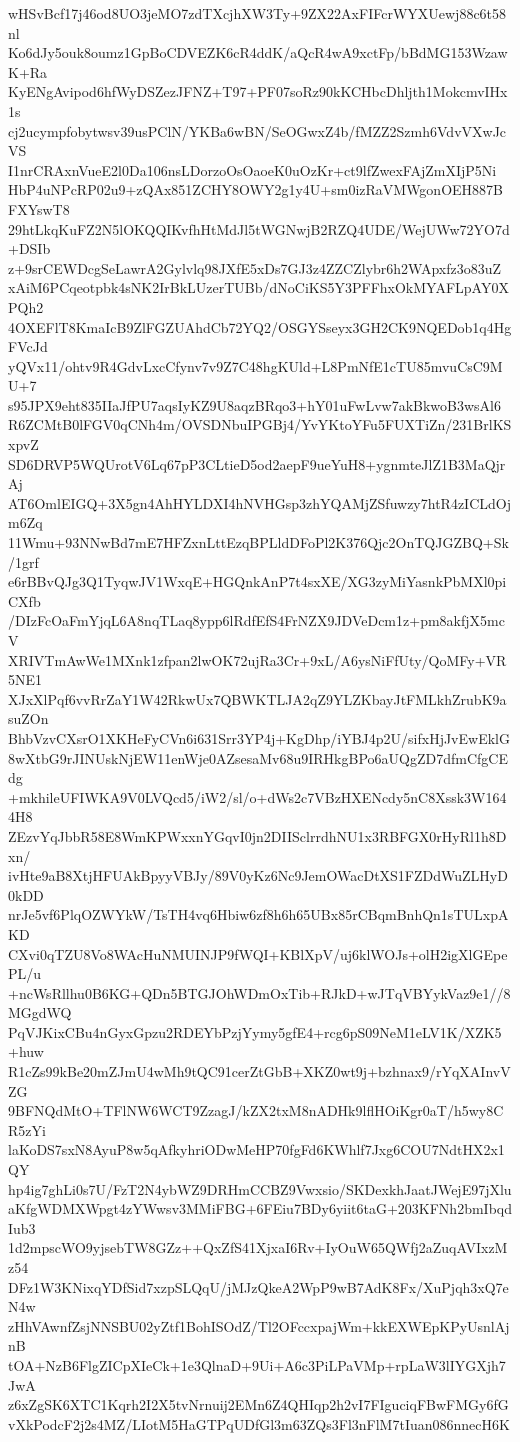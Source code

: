 wHSvBcf17j46od8UO3jeMO7zdTXcjhXW3Ty+9ZX22AxFIFcrWYXUewj88c6t58nl
Ko6dJy5ouk8oumz1GpBoCDVEZK6cR4ddK/aQcR4wA9xctFp/bBdMG153WzawK+Ra
KyENgAvipod6hfWyDSZezJFNZ+T97+PF07soRz90kKCHbcDhljth1MokcmvIHx1s
cj2ucympfobytwsv39usPClN/YKBa6wBN/SeOGwxZ4b/fMZZ2Szmh6VdvVXwJcVS
I1nrCRAxnVueE2l0Da106nsLDorzoOsOaoeK0uOzKr+ct9lfZwexFAjZmXIjP5Ni
HbP4uNPcRP02u9+zQAx851ZCHY8OWY2g1y4U+sm0izRaVMWgonOEH887BFXYswT8
29htLkqKuFZ2N5lOKQQIKvfhHtMdJl5tWGNwjB2RZQ4UDE/WejUWw72YO7d+DSIb
z+9srCEWDcgSeLawrA2Gylvlq98JXfE5xDs7GJ3z4ZZCZlybr6h2WApxfz3o83uZ
xAiM6PCqeotpbk4sNK2IrBkLUzerTUBb/dNoCiKS5Y3PFFhxOkMYAFLpAY0XPQh2
4OXEFlT8KmaIcB9ZlFGZUAhdCb72YQ2/OSGYSseyx3GH2CK9NQEDob1q4HgFVcJd
yQVx11/ohtv9R4GdvLxcCfynv7v9Z7C48hgKUld+L8PmNfE1cTU85mvuCsC9MU+7
s95JPX9eht835IIaJfPU7aqsIyKZ9U8aqzBRqo3+hY01uFwLvw7akBkwoB3wsAl6
R6ZCMtB0lFGV0qCNh4m/OVSDNbuIPGBj4/YvYKtoYFu5FUXTiZn/231BrlKSxpvZ
SD6DRVP5WQUrotV6Lq67pP3CLtieD5od2aepF9ueYuH8+ygnmteJlZ1B3MaQjrAj
AT6OmlEIGQ+3X5gn4AhHYLDXI4hNVHGsp3zhYQAMjZSfuwzy7htR4zICLdOjm6Zq
11Wmu+93NNwBd7mE7HFZxnLttEzqBPLldDFoPl2K376Qjc2OnTQJGZBQ+Sk/1grf
e6rBBvQJg3Q1TyqwJV1WxqE+HGQnkAnP7t4sxXE/XG3zyMiYasnkPbMXl0piCXfb
/DIzFcOaFmYjqL6A8nqTLaq8ypp6lRdfEfS4FrNZX9JDVeDcm1z+pm8akfjX5mcV
XRIVTmAwWe1MXnk1zfpan2lwOK72ujRa3Cr+9xL/A6ysNiFfUty/QoMFy+VR5NE1
XJxXlPqf6vvRrZaY1W42RkwUx7QBWKTLJA2qZ9YLZKbayJtFMLkhZrubK9asuZOn
BhbVzvCXsrO1XKHeFyCVn6i631Srr3YP4j+KgDhp/iYBJ4p2U/sifxHjJvEwEklG
8wXtbG9rJINUskNjEW11enWje0AZsesaMv68u9IRHkgBPo6aUQgZD7dfmCfgCEdg
+mkhileUFIWKA9V0LVQcd5/iW2/sl/o+dWs2c7VBzHXENcdy5nC8Xssk3W1644H8
ZEzvYqJbbR58E8WmKPWxxnYGqvI0jn2DIISclrrdhNU1x3RBFGX0rHyRl1h8Dxn/
ivHte9aB8XtjHFUAkBpyyVBJy/89V0yKz6Nc9JemOWacDtXS1FZDdWuZLHyD0kDD
nrJe5vf6PlqOZWYkW/TsTH4vq6Hbiw6zf8h6h65UBx85rCBqmBnhQn1sTULxpAKD
CXvi0qTZU8Vo8WAcHuNMUINJP9fWQI+KBlXpV/uj6klWOJs+olH2igXlGEpePL/u
+ncWsRllhu0B6KG+QDn5BTGJOhWDmOxTib+RJkD+wJTqVBYykVaz9e1//8MGgdWQ
PqVJKixCBu4nGyxGpzu2RDEYbPzjYymy5gfE4+rcg6pS09NeM1eLV1K/XZK5+huw
R1cZs99kBe20mZJmU4wMh9tQC91cerZtGbB+XKZ0wt9j+bzhnax9/rYqXAInvVZG
9BFNQdMtO+TFlNW6WCT9ZzagJ/kZX2txM8nADHk9lflHOiKgr0aT/h5wy8CR5zYi
laKoDS7sxN8AyuP8w5qAfkyhriODwMeHP70fgFd6KWhlf7Jxg6COU7NdtHX2x1QY
hp4ig7ghLi0s7U/FzT2N4ybWZ9DRHmCCBZ9Vwxsio/SKDexkhJaatJWejE97jXlu
aKfgWDMXWpgt4zYWwsv3MMiFBG+6FEiu7BDy6yiit6taG+203KFNh2bmIbqdIub3
1d2mpscWO9yjsebTW8GZz++QxZfS41XjxaI6Rv+IyOuW65QWfj2aZuqAVIxzMz54
DFz1W3KNixqYDfSid7xzpSLQqU/jMJzQkeA2WpP9wB7AdK8Fx/XuPjqh3xQ7eN4w
zHhVAwnfZsjNNSBU02yZtf1BohISOdZ/Tl2OFccxpajWm+kkEXWEpKPyUsnlAjnB
tOA+NzB6FlgZICpXIeCk+1e3QlnaD+9Ui+A6c3PiLPaVMp+rpLaW3lIYGXjh7JwA
z6xZgSK6XTC1Kqrh2I2X5tvNrnuij2EMn6Z4QHIqp2h2vI7FIguciqFBwFMGy6fG
vXkPodcF2j2s4MZ/LIotM5HaGTPqUDfGl3m63ZQs3Fl3nFlM7tIuan086nnecH6K
